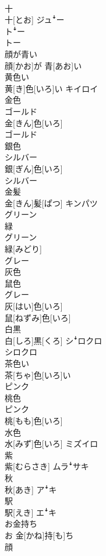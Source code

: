 \documentclass[8pt]{extreport}
\begin{document}
\begin{CJK}{UTF8}{min}
\\	十	
\\	十[とお]	ジュꜜー 
\\	トꜜー 
\\	トー
\\	顔が青い	
\\	顔[かお]が 青[あお]い	
\\	黄色い	
\\	黄[き]色[いろ]い	キイロイ
\\	金色 
\\	ゴールド	
\\	金[きん]色[いろ] 
\\	ゴールド	
\\	銀色 
\\	シルバー	
\\	銀[ぎん]色[いろ] 
\\	シルバー	
\\	金髪	
\\	金[きん]髪[ぱつ]	キンパツ
\\	グリーン 
\\	緑	
\\	グリーン 
\\	緑[みどり]	
\\	グレー 
\\	灰色 
\\	鼠色	
\\	グレー 
\\	灰[はい]色[いろ] 
\\	鼠[ねずみ]色[いろ]	
\\	白黒	
\\	白[しろ]黒[くろ]	シꜜロクロ 
\\	シロクロ
\\	茶色い	
\\	茶[ちゃ]色[いろ]い	
\\	ピンク 
\\	桃色	
\\	ピンク 
\\	桃[もも]色[いろ]	
\\	水色	
\\	水[みず]色[いろ]	ミズイロ
\\	紫	
\\	紫[むらさき]	ムラꜜサキ
\\	秋	
\\	秋[あき]	アꜜキ
\\	駅	
\\	駅[えき]	エꜜキ
\\	お金持ち	
\\	お 金[かね]持[も]ち	
\\	顔	

\end{CJK}
\end{document}
